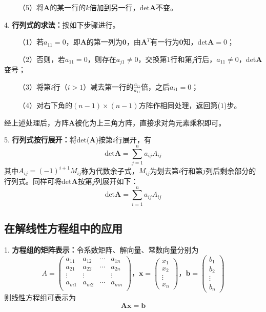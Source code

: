 ~~~~（5）将$\boldsymbol{A}$的某一行的$k$倍加到另一行，det$\boldsymbol{A}$不变。

4. \textbf{行列式的求法：}按如下步骤进行。

~~~~（1）若$a_{11}=0$，即$\boldsymbol{A}$的第一列为$\boldsymbol{0}$，由$\boldsymbol{A}^T$有一行为$\boldsymbol{0}$知，det$\boldsymbol{A}=0$；

~~~~（2）否则，若$a_{11}=0$，则存在$a_{j1}\neq 0$，交换第$1$行和第$j$行后，$a_{11}\neq 0$，det$\boldsymbol{A}$变号；

~~~~（3）将第$i$行（$i>1$）减去第一行的$\frac{a_{i1}}{a_{11}}$倍，之后$a_{i1}=0$；

~~~~（4）对右下角的$(n-1)\times (n-1)$方阵作相同处理，返回第($1$)步。

经上述处理后，方阵$\boldsymbol{A}$被化为上三角方阵，直接求对角元素乘积即可。

5. \textbf{行列式按行展开：}将det($\boldsymbol{A}$)按第$i$行展开，有
\begin{equation*}
    \text{det} \boldsymbol{A} =\sum\limits_{j=1}^n a_{ij}A_{ij}
\end{equation*}
其中$A_{ij}=(-1)^{i+1}M_{ij}$称为代数余子式，$M_{ij}$为划去第$i$行和第$j$列后剩余部分的行列式。同样可将det$\boldsymbol{A}$按第$j$列展开如下：
\begin{equation*}
    \text{det}\boldsymbol{A}=\sum\limits_{i=1}^n a_{ij}A_{ij}
\end{equation*}

\subsection{在解线性方程组中的应用}

1. \textbf{方程组的矩阵表示：}令系数矩阵、解向量、常数向量分别为
\begin{equation*}
    A=\begin{pmatrix}
        a_{11}&a_{12}&\cdots&a_{1n}\\
        a_{21}&a_{22}&\cdots&a_{2n}\\
        \vdots&\vdots&&\vdots\\
        a_{m1}&a_{m2}&\cdots&a_{mn}\\
    \end{pmatrix}\text{，}\boldsymbol{x}=\begin{pmatrix}
        x_1\\
        x_2\\
        \vdots\\
        x_n
    \end{pmatrix}\text{，}\boldsymbol{b}=\begin{pmatrix}
        b_1\\
        b_2\\
        \vdots\\
        b_n
    \end{pmatrix}
\end{equation*}
则线性方程组可表示为
\begin{equation*}
    \boldsymbol{A}\boldsymbol{x}=\boldsymbol{b}
\end{equation*}

